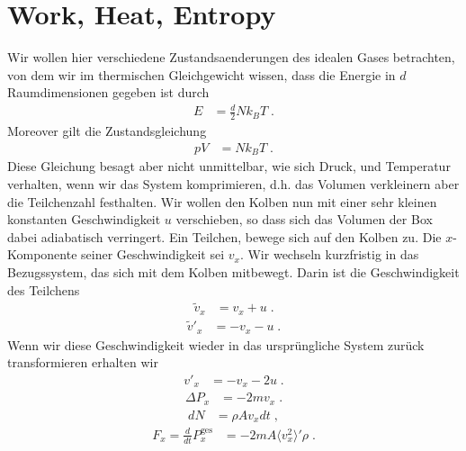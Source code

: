 

\section{Work, Heat, Entropy}

Wir wollen hier verschiedene Zustandsaenderungen des idealen Gases betrachten, von dem wir im thermischen Gleichgewicht wissen, dass die Energie in $d$ Raumdimensionen gegeben ist durch
\begin{align}\label{eq:heat:eNkT}
E &= \frac{d}{2} N k_{B} T\;.
\end{align} 
Moreover gilt die Zustandsgleichung 
\begin{align*}
p V &= N k_{B} T\;.
\end{align*}
Diese Gleichung besagt aber nicht unmittelbar, wie sich
Druck, und Temperatur verhalten, wenn wir  das System komprimieren, d.h. das Volumen verkleinern aber die Teilchenzahl festhalten.
Wir wollen den Kolben nun mit einer sehr kleinen konstanten Geschwindigkeit $u$ verschieben, so dass sich das Volumen der Box dabei adiabatisch verringert. Ein Teilchen, bewege sich auf den Kolben zu. Die $x$-Komponente seiner Geschwindigkeit sei $v_{x}$. 
Wir wechseln kurzfristig in das Bezugssystem, das sich mit dem Kolben mitbewegt. Darin ist die Geschwindigkeit des Teilchens
\begin{align*}
\tilde v_{x} &= v_{x} + u\;.
\end{align*}
\begin{align*}
\tilde v'_{x} &= -v_{x} - u\;.
\end{align*}
Wenn wir diese Geschwindigkeit wieder in das ursprüngliche System zurück transformieren erhalten wir
\begin{align*}
v'_{x} &= -v_{x} - 2 u\;.
\end{align*}
\begin{align*}
\Delta  P_{x} &= - 2 m v_{x}\;.
\end{align*}
\begin{align*}
d N &= \rho A v_{x} dt\;,
\end{align*}
\begin{align*}
F_{x}= \frac{d}{dt} P^\text{ges}_{x} &= -2 m A 
 \langle v_{x}^{2}\rangle'  \rho \;.
\end{align*}
